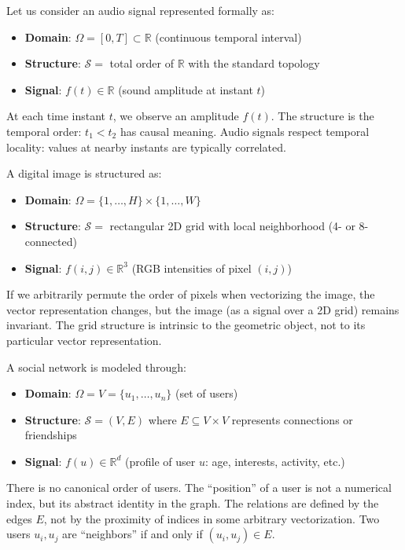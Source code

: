 \begin{example}\label{ex:senal_audio}
Let us consider an audio signal represented formally as:
\begin{itemize}
	\item \textbf{Domain}: $\Omega = [0, T] \subset \mathbb{R}$ (continuous temporal interval)
	\item \textbf{Structure}: $\mathcal{S} = $ total order of $\mathbb{R}$ with the standard topology
	\item \textbf{Signal}: $f(t) \in \mathbb{R}$ (sound amplitude at instant $t$)
\end{itemize}

At each time instant $t$, we observe an amplitude $f(t)$. The structure is the temporal order: $t_1 < t_2$ has causal meaning. Audio signals respect temporal locality: values at nearby instants are typically correlated.
\end{example}

\begin{example}\label{ex:imagen_grilla}
A digital image is structured as:
\begin{itemize}
	\item \textbf{Domain}: $\Omega = \{1,\ldots,H\} \times \{1,\ldots,W\}$
	\item \textbf{Structure}: $\mathcal{S} = $ rectangular 2D grid with local neighborhood (4- or 8-connected)
	\item \textbf{Signal}: $f(i,j) \in \mathbb{R}^3$ (RGB intensities of pixel $(i,j)$)
\end{itemize}

If we arbitrarily permute the order of pixels when vectorizing the image, the vector representation changes, but the image (as a signal over a 2D grid) remains invariant. The grid structure is intrinsic to the geometric object, not to its particular vector representation.
\end{example}

\begin{example}\label{ex:red_social}
A social network is modeled through:
\begin{itemize}
	\item \textbf{Domain}: $\Omega = V = \{u_1, \ldots, u_n\}$ (set of users)
	\item \textbf{Structure}: $\mathcal{S} = (V, E)$ where $E \subseteq V \times V$ represents connections or friendships
	\item \textbf{Signal}: $f(u) \in \mathbb{R}^d$ (profile of user $u$: age, interests, activity, etc.)
\end{itemize}

There is no canonical order of users. The ``position'' of a user is not a numerical index, but its abstract identity in the graph. The relations are defined by the edges $E$, not by the proximity of indices in some arbitrary vectorization. Two users $u_i, u_j$ are ``neighbors'' if and only if $(u_i, u_j) \in E$.
\end{example}

